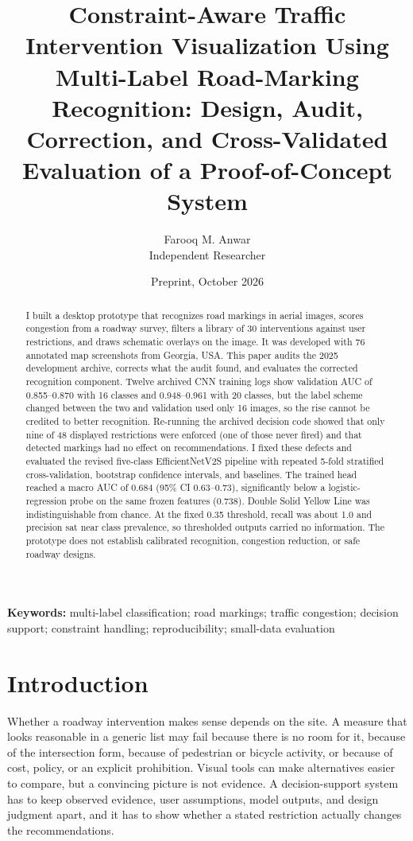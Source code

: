 \documentclass[11pt]{article}
\title{Constraint-Aware Traffic Intervention Visualization Using Multi-Label Road-Marking Recognition: Design, Audit, Correction, and Cross-Validated Evaluation of a Proof-of-Concept System}
\author{Farooq M. Anwar\\\small Independent Researcher}
\date{Preprint, October 2026}
\begin{document}
\maketitle

\begin{abstract}
I built a desktop prototype that recognizes road markings in aerial images, scores congestion from a roadway survey, filters a library of 30 interventions against user restrictions, and draws schematic overlays on the image. It was developed with 76 annotated map screenshots from Georgia, USA. This paper audits the 2025 development archive, corrects what the audit found, and evaluates the corrected recognition component. Twelve archived CNN training logs show validation AUC of 0.855--0.870 with 16 classes and 0.948--0.961 with 20 classes, but the label scheme changed between the two and validation used only 16 images, so the rise cannot be credited to better recognition. Re-running the archived decision code showed that only nine of 48 displayed restrictions were enforced (one of those never fired) and that detected markings had no effect on recommendations. I fixed these defects and evaluated the revised five-class EfficientNetV2S pipeline with repeated 5-fold stratified cross-validation, bootstrap confidence intervals, and baselines. The trained head reached a macro AUC of 0.684 (95\% CI 0.63--0.73), significantly below a logistic-regression probe on the same frozen features (0.738). Double Solid Yellow Line was indistinguishable from chance. At the fixed 0.35 threshold, recall was about 1.0 and precision sat near class prevalence, so thresholded outputs carried no information. The prototype does not establish calibrated recognition, congestion reduction, or safe roadway designs.
\end{abstract}

\noindent\textbf{Keywords:} multi-label classification; road markings; traffic congestion; decision support; constraint handling; reproducibility; small-data evaluation

\section{Introduction}
Whether a roadway intervention makes sense depends on the site. A measure that looks reasonable in a generic list may fail because there is no room for it, because of the intersection form, because of pedestrian or bicycle activity, or because of cost, policy, or an explicit prohibition. Visual tools can make alternatives easier to compare, but a convincing picture is not evidence. A decision-support system has to keep observed evidence, user assumptions, model outputs, and design judgment apart, and it has to show whether a stated restriction actually changes the recommendations.
\end{document}
